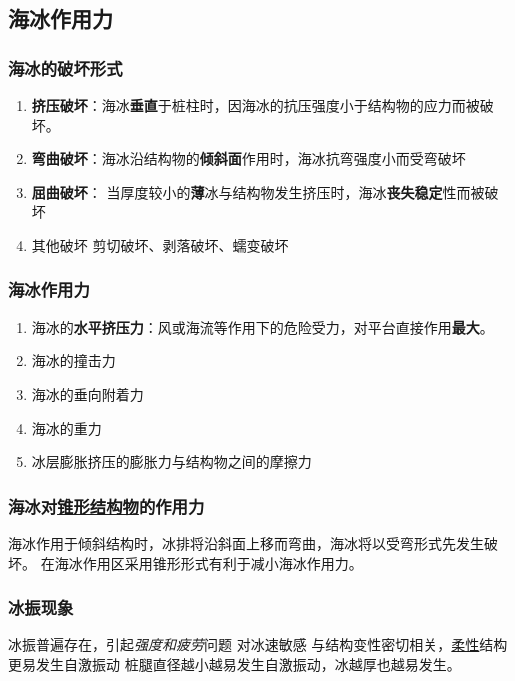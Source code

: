 \subsection{海冰作用力}

\subsubsection{海冰的破坏形式}
\begin{enumerate}
	\item \textbf{挤压破坏}：海冰\textbf{垂直}于桩柱时，因海冰的抗压强度小于结构物的应力而被破坏。
	\item \textbf{弯曲破坏}：海冰沿结构物的\textbf{倾斜面}作用时，海冰抗弯强度小而受弯破坏
	\item \textbf{屈曲破坏}： 当厚度较小的\textbf{薄}冰与结构物发生挤压时，海冰\textbf{丧失稳定}性而被破坏
	\item 其他破坏 剪切破坏、剥落破坏、蠕变破坏
\end{enumerate}
\subsubsection{海冰作用力}
\begin{enumerate}
	\item 海冰的\textbf{水平挤压力}：风或海流等作用下的危险受力，对平台直接作用\textbf{最大}。
	\item 海冰的撞击力
	\item 海冰的垂向附着力
	\item 海冰的重力
	\item 冰层膨胀挤压的膨胀力与结构物之间的摩擦力
\end{enumerate}
\subsubsection{海冰对\underline{锥形结构物}的作用力}
海冰作用于倾斜结构时，冰排将沿斜面上移而弯曲，海冰将以受弯形式先发生破坏。
在海冰作用区采用锥形形式有利于减小海冰作用力。
\subsubsection{冰振现象}
冰振普遍存在，引起\textit{强度和疲劳}问题
对冰速敏感
与结构变性密切相关，\underline{柔性}结构更易发生自激振动
桩腿直径越小越易发生自激振动，冰越厚也越易发生。
